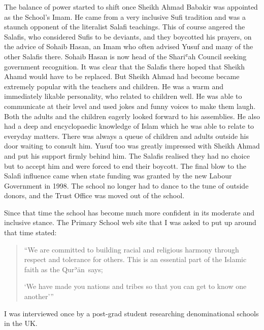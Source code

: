 \documentclass[12pt]{memoir}
\def\´{ʾ} %
\def\`{ʿ} %
\def \Quran{Qur\-\´ān} %
\begin{document}
The balance of power started to shift once Sheikh Ahmad Babakir
was appointed as the School’s Imam.
He came from a very inclusive Sufi tradition
and was a staunch opponent of the literalist Salafi teachings.
This of course angered the Salafis, who considered Sufis to be deviants,
and they boycotted his prayers, on the advice of Sohaib Hasan,
an Imam who often advised Yusuf and many of the other Salafis there.
Sohaib Hasan is now head of the Shari\`ah Council
seeking government recognition.
It was clear that the Salafis there hoped
that Sheikh Ahamd would have to be replaced.
But Sheikh Ahmad had become became extremely popular
with the teachers and children.
He was a warm and immediately likable personality,
who related to children well.
He was able to communicate at their level
and used jokes and funny voices to make them laugh.
Both the adults and the children eagerly looked forward to his assemblies.
He also had a deep and encyclopaedic knowledge of Islam
which he was able to relate to everyday matters.
There was always a queue of children
and adults outside his door waiting to consult him.
Yusuf too was greatly impressed with Sheikh Ahmad
and put his support firmly behind him.
The Salafis realised they had no choice
but to accept him and were forced to end their boycott.
The final blow to the Salafi influence came
when state funding was granted by the new Labour Government in 1998.
The school no longer had to dance to the tune of outside donors,
and the Trust Office was moved out of the school.

Since that time the school has become much more confident
in its moderate and inclusive stance.
The Primary School web site that I was asked to put up around that time stated:

\begin{quote}
“We are committed to building racial and religious harmony
through respect and tolerance for others.
This is an essential part of the Islamic faith as the \Quran\ says;

‘We have made you nations and tribes so that you can get to know one another’”
\end{quote}

I was interviewed once by a post-grad student
researching denominational schools in the UK.
\end{document}
